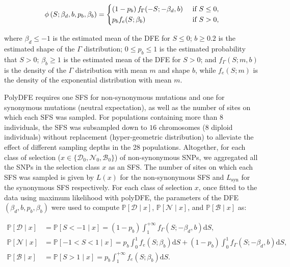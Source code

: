 \documentclass{article}
\newcommand{\der}{\text{d}}
\newcommand{\proba}{\mathbb{P}}
\newcommand{\SphyDel}{\mathcal{D}_0}
\newcommand{\SphyNeu}{\mathcal{N}_0}
\newcommand{\SphyBen}{\mathcal{B}_0}
\newcommand{\Sphyclass}{x}
\newcommand{\given}{\mid}
\newcommand{\Spop}{S}
\newcommand{\SpopDel}{\mathcal{D}}
\newcommand{\SpopNeu}{\mathcal{N}}
\newcommand{\SpopBen}{\mathcal{B}}
\newcommand{\AdvMean}{\beta_b}
\newcommand{\DelMean}{\beta_d}
\begin{document}
    \begin{equation}
        \phi \left( \Spop; \DelMean , b, p_b, \AdvMean \right) =
        \begin{dcases}
            \left( 1 - p_b \right) f_{\Gamma}(-\Spop; -\DelMean, b) & \text{ if $\Spop \leq 0$,} \\
            p_b f_{e}(\Spop; \AdvMean) & \text{ if $\Spop > 0$,} \\
        \end{dcases}
    \end{equation}

    where $\DelMean \leq -1 $ is the estimated mean of the DFE for $\Spop \leq 0$;
    $b \geq 0.2$ is the estimated shape of the $\Gamma$ distribution;
    $0 \leq p_b \leq 1$ is the estimated probability that $\Spop > 0$;
    $\AdvMean \geq 1$ is the estimated mean of the DFE for $\Spop > 0$;
    and $f_{\Gamma}(\Spop; m, b)$ is the density of the $\Gamma$ distribution with mean $m$ and shape $b$, while $f_{e}(\Spop; m)$ is the density of the exponential distribution with mean $m$.

    PolyDFE requires one SFS for non-synonymous mutations and one for synonymous mutations (neutral expectation), as well as the number of sites on which each SFS was sampled.
    For populations containing more than $8$ individuals, the SFS was subsampled down to $16$ chromosomes ($8$ diploid individuals) without replacement (hyper-geometric distribution) to alleviate the effect of different sampling depths in the 28 populations.
    Altogether, for each class of selection ($\Sphyclass \in \{\SphyDel, \SphyNeu, \SphyBen \}$) of non-synonymous SNPs, we aggregated all the SNPs in the selection class $\Sphyclass$ as an SFS.
    The number of sites on which each SFS was sampled is given by $L(\Sphyclass)$ for the non-synonymous SFS and $L_{\text{syn}}$ for the synonymous SFS respectively.
    For each class of selection $\Sphyclass$, once fitted to the data using maximum likelihood with polyDFE, the parameters of the DFE $\left( \DelMean , b, p_b, \AdvMean \right)$ were used to compute $\proba [ \SpopDel \given  \Sphyclass] $, $\proba [ \SpopNeu \given \Sphyclass]$, and $\proba [ \SpopBen \given \Sphyclass]$ as:

    \begin{align}
        \proba [ \SpopDel \given  \Sphyclass] &= \proba [ \Spop < -1 \given \Sphyclass ] = \left( 1 - p_b \right) \int_{1}^{+\infty} f_{\Gamma}(\Spop; -\DelMean, b) \der \Spop, \label{eq:polyProbaDel} \\
        \proba [ \SpopNeu \given \Sphyclass] &= \proba [ -1 < \Spop < 1 \given \Sphyclass ] = p_b \int_{0}^{1} f_{e}(\Spop; \AdvMean) \der \Spop + \left( 1 - p_b \right) \int_{0}^{1} f_{\Gamma}(\Spop; -\DelMean, b) \der \Spop, \\
        \proba [ \SpopBen \given \Sphyclass] &= \proba [ \Spop > 1 \given \Sphyclass] = p_b \int_{1}^{+\infty} f_{e}(\Spop; \AdvMean) \der \Spop. \label{eq:polyProbaAdv}
    \end{align}
\end{document}
